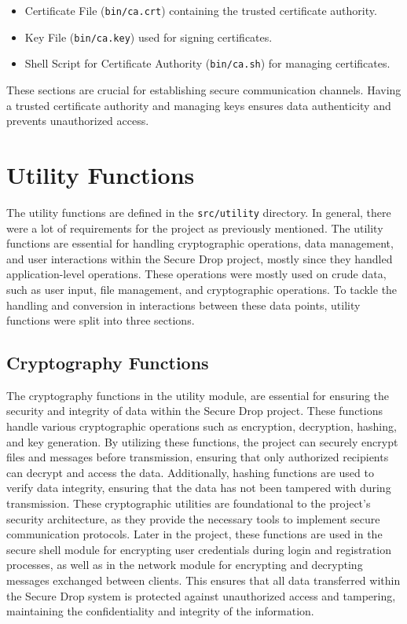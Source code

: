 \documentclass[12pt]{article}
\begin{document}


\begin{itemize}
    \item Certificate File (\texttt{bin/ca.crt}) containing the trusted certificate authority.
    \item Key File (\texttt{bin/ca.key}) used for signing certificates.
    \item Shell Script for Certificate Authority (\texttt{bin/ca.sh}) for managing certificates.
\end{itemize}

These sections are crucial for establishing secure communication channels. Having a trusted certificate authority and managing keys ensures data authenticity and prevents unauthorized access.

\newpage

\section{Utility Functions}
The utility functions are defined in the \texttt{src/utility} directory. In general, there were a lot of requirements for the project as previously mentioned.
The utility functions are essential for handling cryptographic operations, data management, and user interactions within the Secure Drop project, mostly since they handled application-level operations.
These operations were mostly used on crude data, such as user input, file management, and cryptographic operations. To tackle the handling and conversion in interactions between these data points, utility functions were split into three sections.

\subsection{Cryptography Functions}


The cryptography functions in the utility module, are essential for ensuring the security and integrity of data within the Secure Drop project. These functions handle various cryptographic operations such as encryption, decryption, hashing, and key generation. By utilizing these functions, the project can securely encrypt files and messages before transmission, ensuring that only authorized recipients can decrypt and access the data. Additionally, hashing functions are used to verify data integrity, ensuring that the data has not been tampered with during transmission. These cryptographic utilities are foundational to the project's security architecture, as they provide the necessary tools to implement secure communication protocols. Later in the project, these functions are used in the secure shell module for encrypting user credentials during login and registration processes, as well as in the network module for encrypting and decrypting messages exchanged between clients. This ensures that all data transferred within the Secure Drop system is protected against unauthorized access and tampering, maintaining the confidentiality and integrity of the information.
\end{document}
